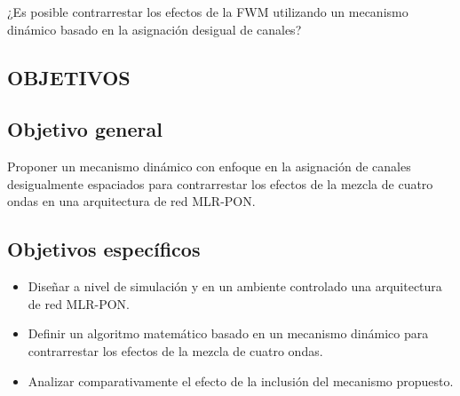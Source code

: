 ¿Es posible contrarrestar los efectos de la FWM utilizando un mecanismo dinámico basado en la asignación desigual de canales?




\begin{center}
    \item  \section{OBJETIVOS}
\end{center}

\subsection{Objetivo general}

Proponer un mecanismo dinámico con enfoque en la asignación de canales desigualmente espaciados para contrarrestar los efectos de la mezcla de cuatro ondas en una arquitectura de red MLR-PON.


\subsection{Objetivos específicos}
\begin{itemize}
    
    \item Diseñar a nivel de simulación y en un ambiente controlado una arquitectura de red MLR-PON.

    \item Definir un algoritmo matemático basado en un mecanismo dinámico para contrarrestar los efectos de la mezcla de cuatro ondas.

    \item Analizar comparativamente el efecto de la inclusión del mecanismo propuesto.
\end{itemize}

